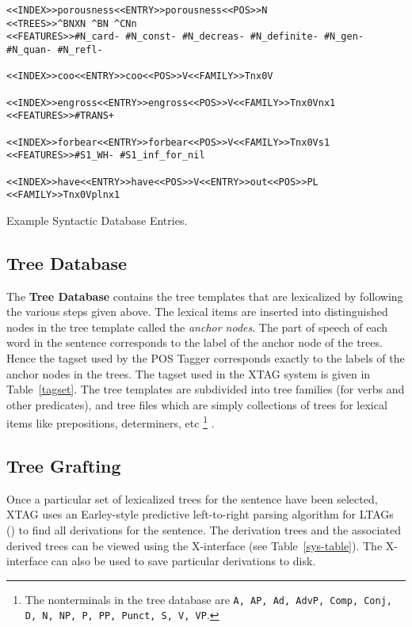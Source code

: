\begin{table}[htb]
\begin{verbatim}
<<INDEX>>porousness<<ENTRY>>porousness<<POS>>N
<<TREES>>^BNXN ^BN ^CNn
<<FEATURES>>#N_card- #N_const- #N_decreas- #N_definite- #N_gen- 
#N_quan- #N_refl-

<<INDEX>>coo<<ENTRY>>coo<<POS>>V<<FAMILY>>Tnx0V

<<INDEX>>engross<<ENTRY>>engross<<POS>>V<<FAMILY>>Tnx0Vnx1
<<FEATURES>>#TRANS+

<<INDEX>>forbear<<ENTRY>>forbear<<POS>>V<<FAMILY>>Tnx0Vs1
<<FEATURES>>#S1_WH- #S1_inf_for_nil

<<INDEX>>have<<ENTRY>>have<<POS>>V<<ENTRY>>out<<POS>>PL
<<FAMILY>>Tnx0Vplnx1
\end{verbatim}   
\caption{Example Syntactic Database Entries.}

\label{syn-entries}
\end{table}

\subsection{Tree Database}
\label{tree-db}

The {\bf Tree Database} contains the tree templates that are
lexicalized by following the various steps given above. The lexical
items are inserted into distinguished nodes in the tree template
called the {\em anchor nodes}.  The part of speech of each word in the
sentence corresponds to the label of the anchor node of the trees.
Hence the tagset used by the POS Tagger corresponds exactly to the
labels of the anchor nodes in the trees.  The tagset used in the XTAG
system is given in Table~\ref{tagset}. The tree templates are
subdivided into tree families (for verbs and other predicates), and
tree files which are simply collections of trees for lexical items
like prepositions, determiners, etc%
\footnote{ The nonterminals in the tree database are {\tt A, AP, Ad,
    AdvP, Comp, Conj, D, N, NP, P, PP, Punct, S, V, VP}.}%
.

\subsection{Tree Grafting}

Once a particular set of lexicalized trees for the sentence have been
selected, XTAG uses an Earley-style predictive left-to-right parsing
algorithm for LTAGs (\cite{schabesjoshi88,schabes90}) to find all
derivations for the sentence. The derivation trees and the associated
derived trees can be viewed using the X-interface (see
Table~\ref{sys-table}). The X-interface can also be used to save
particular derivations to disk.

